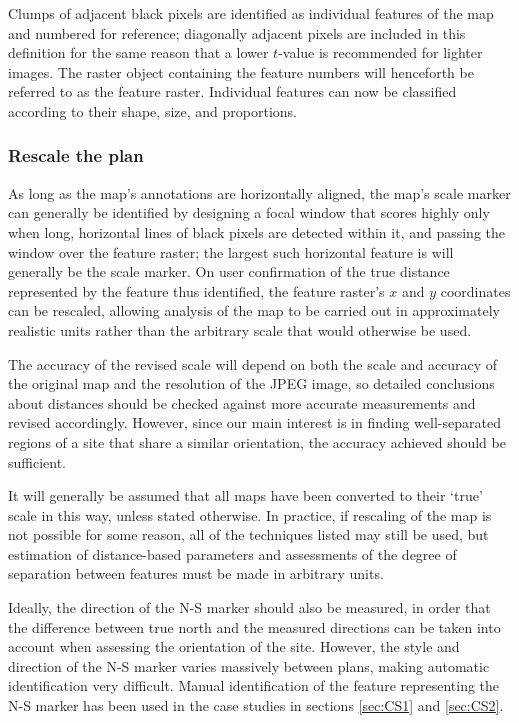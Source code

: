 \documentclass[../../ArchStats.tex]{subfiles}
\begin{document}
Clumps of adjacent black pixels are identified as individual features of the map and numbered for reference; diagonally adjacent pixels are included in this definition for the same reason that a lower $t$-value is recommended for lighter images. The raster object containing the feature numbers will henceforth be referred to as the feature raster. Individual features can now be classified according to their shape, size, and proportions.

\subsubsection{Rescale the plan}
\label{sec:rescale}

As long as the map's annotations are horizontally aligned, the map's scale marker can generally be identified by designing a focal window that scores highly only when long, horizontal lines of black pixels are detected within it, and passing the window over the feature raster; the largest such horizontal feature is will generally be the scale marker. On user confirmation of the true distance represented by the feature thus identified, the feature raster's $x$ and $y$ coordinates can be rescaled, allowing analysis of the map to be carried out in approximately realistic units rather than the arbitrary scale that would otherwise be used.

The accuracy of the revised scale will depend on both the scale and accuracy of the original map and the resolution of the JPEG image, so detailed conclusions about distances should be checked against more accurate measurements and revised accordingly. However, since our main interest is in finding well-separated regions of a site that share a similar orientation, the accuracy achieved should be sufficient.

It will generally be assumed that all maps have been converted to their `true' scale in this way, unless stated otherwise. In practice, if rescaling of the map is not possible for some reason, all of the techniques listed may still be used, but estimation of distance-based parameters and assessments of the degree of separation between features must be made in arbitrary units.

Ideally, the direction of the N-S marker should also be measured, in order that the difference between true north and the measured directions can be taken into account when assessing the orientation of the site. However, the style and direction of the N-S marker varies massively between plans, making automatic identification very difficult. Manual identification of the feature representing the N-S marker has been used in the case studies in sections \ref{sec:CS1} and \ref{sec:CS2}.
\end{document}
